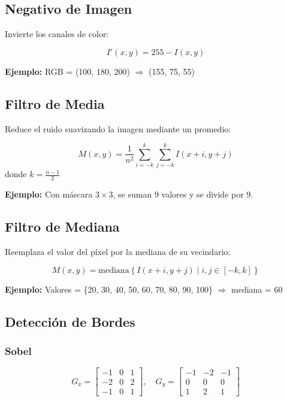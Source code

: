 \documentclass[12pt]{article}
\begin{document}
\subsection{Negativo de Imagen}

Invierte los canales de color:

\[
I'(x, y) = 255 - I(x, y)
\]

\textbf{Ejemplo:}  
RGB = (100, 180, 200) $\Rightarrow$ (155, 75, 55)

\subsection{Filtro de Media}

Reduce el ruido suavizando la imagen mediante un promedio:

\[
M(x, y) = \frac{1}{n^2} \sum_{i=-k}^{k} \sum_{j=-k}^{k} I(x+i, y+j)
\]
donde $k = \frac{n-1}{2}$

\textbf{Ejemplo:}  
Con máscara $3\times3$, se suman 9 valores y se divide por 9.

\subsection{Filtro de Mediana}

Reemplaza el valor del píxel por la mediana de su vecindario:

\[
M(x, y) = \text{mediana} \left\{ I(x+i, y+j) \mid i,j \in [-k,k] \right\}
\]

\textbf{Ejemplo:}  
Valores = \{20, 30, 40, 50, 60, 70, 80, 90, 100\}  
$\Rightarrow$ mediana = 60

\subsection{Detección de Bordes}

\subsubsection{Sobel}

\[
G_x =
\begin{bmatrix}
-1 & 0 & 1\\
-2 & 0 & 2\\
-1 & 0 & 1
\end{bmatrix}, \quad
G_y =
\begin{bmatrix}
-1 & -2 & -1\\
0 & 0 & 0\\
1 & 2 & 1
\end{bmatrix}
\]
\end{document}
